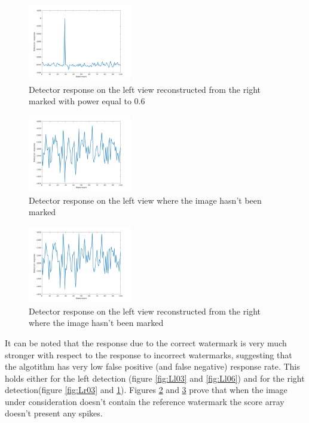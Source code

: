 \begin{figure}[h!]
\centering
\includegraphics[width=0.4\textwidth]{./img/likelihood/correct_LikelihoodLr_06.png}
\caption{\small{Detector response on the left view reconstructed from the right marked with power equal to 0.6}}
\label{fig:Lr06}
\end{figure}
\begin{figure}[h!]
\centering
\includegraphics[width=0.4\textwidth]{./img/likelihood/correct_LikelihoodL_NM.png}
\caption{\small{Detector response on the left view where the image hasn't been marked}}
\label{fig:Llnm}
\end{figure}
\begin{figure}[h!]
\centering
\includegraphics[width=0.4\textwidth]{./img/likelihood/correct_LikelihoodLr_NM.png}
\caption{\small{Detector response on the left view reconstructed from the right where the image hasn't been marked}}
\label{fig:Lrnm}
\end{figure}
\clearpage
It can be noted that the response due to the correct watermark is very much stronger with respect to the response to incorrect watermarks, suggesting that the algotithm has very low false positive (and false negative) response rate. This holds either for the left detection (figure \ref{fig:Ll03} and \ref{fig:Ll06}) and for the right detection(figure \ref{fig:Lr03} and \ref{fig:Lr06}). \newline Figures \ref{fig:Llnm} and  \ref{fig:Lrnm} prove that when the image under consideration doesn't contain the reference watermark the score array doesn't present any spikes.

